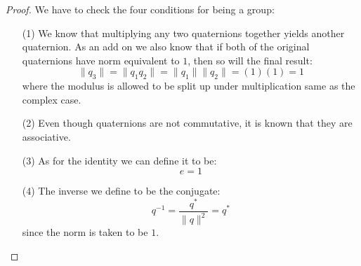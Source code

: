 \documentclass[12pt, letterpaper, onecolumn, conference, final]{IEEEtran}
\theoremstyle{definition}
\newtheorem{proposition}{Proposition}
\theoremstyle{plain}
\begin{document}
\begin{proof}
We have to check the four conditions for being a group:
\begin{itemize}

\item[(1)]
We know that multiplying any two quaternions together yields another quaternion. As an add on we also know that if both of the original quaternions have norm equivalent to $1$, then so will the final result:
\begin{equation*}
\| q_3 \| = \| q_1q_2 \| = \| q_1 \| \| q_2 \| = (1)(1) = 1
\end{equation*}
where the modulus is allowed to be split up under multiplication same as the complex case.

\item[(2)]
Even though quaternions are not commutative, it is known that they are associative.

\item[(3)]
As for the identity we can define it to be:
\begin{equation*}
e = 1
\end{equation*}

\item[(4)]
The inverse we define to be the conjugate:
\begin{equation*}
q^{-1} = \frac{q^*}{\| q \|^2} = q^*
\end{equation*}
since the norm is taken to be $1$.

\end{itemize}
\end{proof}

\newpage
\begin{center}
\end{center}
\end{document}

